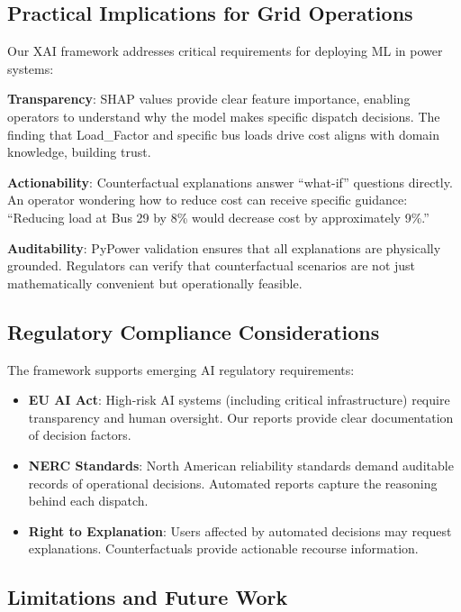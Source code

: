 \documentclass[journal,12pt,onecolumn]{IEEEtran}
\begin{document}
\subsection{Practical Implications for Grid Operations}

Our XAI framework addresses critical requirements for deploying ML in power systems:

\textbf{Transparency}: SHAP values provide clear feature importance, enabling operators to understand why the model makes specific dispatch decisions. The finding that Load\_Factor and specific bus loads drive cost aligns with domain knowledge, building trust.

\textbf{Actionability}: Counterfactual explanations answer ``what-if'' questions directly. An operator wondering how to reduce cost can receive specific guidance: ``Reducing load at Bus 29 by 8\% would decrease cost by approximately 9\%.''

\textbf{Auditability}: PyPower validation ensures that all explanations are physically grounded. Regulators can verify that counterfactual scenarios are not just mathematically convenient but operationally feasible.

\subsection{Regulatory Compliance Considerations}

The framework supports emerging AI regulatory requirements:

\begin{itemize}
    \item \textbf{EU AI Act}: High-risk AI systems (including critical infrastructure) require transparency and human oversight. Our reports provide clear documentation of decision factors.
    
    \item \textbf{NERC Standards}: North American reliability standards demand auditable records of operational decisions. Automated reports capture the reasoning behind each dispatch.
    
    \item \textbf{Right to Explanation}: Users affected by automated decisions may request explanations. Counterfactuals provide actionable recourse information.
\end{itemize}

\subsection{Limitations and Future Work}
\end{document}
